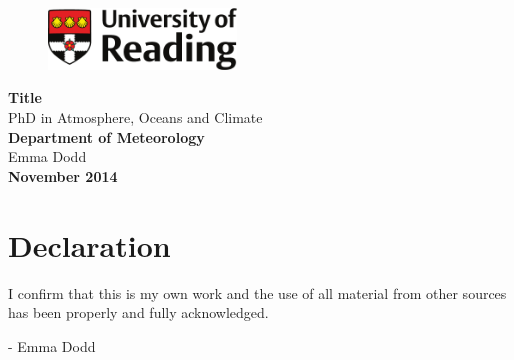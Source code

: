 
\begin{titlepage}
\begin{flushright}
\begin{figure}[h]
\begin{flushright}
  \vspace{-2cm}
\includegraphics[width=50mm]{preface/figures/reading_logo.pdf} %
\end{flushright}
\end{figure}
\end{flushright}
\begin{flushleft}
  \vspace{4cm}
\Huge{\bf{Title}}\\ %
\huge{PhD in Atmosphere, Oceans and Climate} \\ %
\Large{\bf{Department of Meteorology}}\\ %
\vspace{2cm}
\huge{Emma Dodd} \\ %
\Large{\bf{November 2014}}\\ %
\end{flushleft}
\end{titlepage}

\thispagestyle{empty}


\vspace{40mm}
\chapter*{\centering \Large \vspace{-20mm}\Huge Declaration}
\thispagestyle{headings}

\par I confirm that this is my own work and the use of all material from other sources has been properly and fully acknowledged.

\vspace*{2cm}
- Emma Dodd %

\newpage
\thispagestyle{empty}

